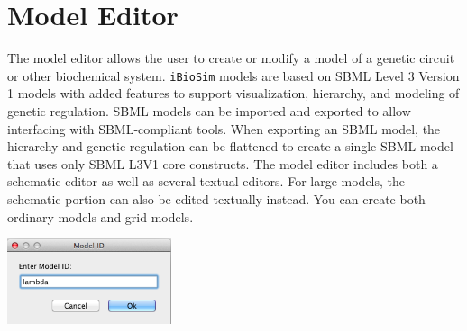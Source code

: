 \documentclass[titlepage,11pt]{article}
\begin{document}
\clearpage

\section{\label{ModelEdit}Model Editor}

\noindent
The model editor allows the user to create or modify a model of a genetic circuit or other biochemical system.  {\tt iBioSim} models are based on SBML Level 3 Version 1 models with added features to support visualization, hierarchy, and modeling of genetic regulation.  SBML models can be imported and exported to allow interfacing with SBML-compliant tools.  When exporting an SBML model, the hierarchy and genetic regulation can be flattened to create a single SBML model that uses only SBML L3V1 core constructs.  The model editor includes both a schematic editor as well as several textual editors.  For large models, the schematic portion can also be edited textually instead.  You can create both ordinary models and grid models.

\begin{center}
\includegraphics[height=25mm]{screenshots/ModelId}
\end{center}
\end{document}
